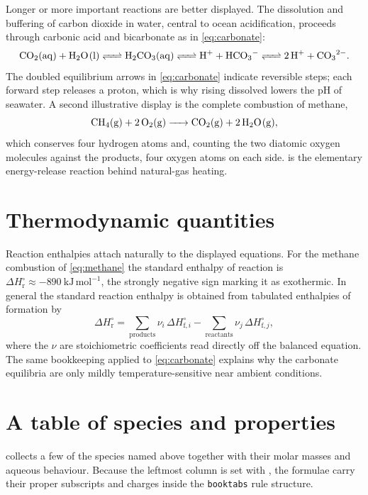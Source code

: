 \documentclass[11pt]{article}
\begin{document}
Longer or more important reactions are better displayed. The dissolution and
buffering of carbon dioxide in water, central to ocean acidification, proceeds
through carbonic acid and bicarbonate as in \cref{eq:carbonate}:
%
\begin{equation}
  \ce{CO2(aq) + H2O(l) <=> H2CO3(aq) <=> H+ + HCO3^- <=> 2 H+ + CO3^2-}.
  \label{eq:carbonate}
\end{equation}
%
The doubled equilibrium arrows in \cref{eq:carbonate} indicate reversible steps;
each forward step releases a proton, which is why rising dissolved 
lowers the $\mathrm{pH}$ of seawater. A second illustrative display is the
complete combustion of methane,
%
\begin{equation}
  \ce{CH4(g) + 2 O2(g) -> CO2(g) + 2 H2O(g)},
  \label{eq:methane}
\end{equation}
%
which conserves four hydrogen atoms and, counting the two diatomic oxygen
molecules against the products, four oxygen atoms on each side. 
is the elementary energy-release reaction behind natural-gas heating.

\section{Thermodynamic quantities}

Reaction enthalpies attach naturally to the displayed equations. For the methane
combustion of \cref{eq:methane} the standard enthalpy of reaction is
$\Delta H^\circ_{\mathrm{r}} \approx -890~\mathrm{kJ\,mol^{-1}}$, the strongly
negative sign marking it as exothermic. In general the standard reaction enthalpy
is obtained from tabulated enthalpies of formation by
\[
  \Delta H^\circ_{\mathrm{r}}
  = \sum_{\text{products}} \nu_i\, \Delta H^\circ_{\mathrm{f},i}
  - \sum_{\text{reactants}} \nu_j\, \Delta H^\circ_{\mathrm{f},j},
\]
where the $\nu$ are stoichiometric coefficients read directly off the balanced
equation. The same bookkeeping applied to \cref{eq:carbonate} explains why the
carbonate equilibria are only mildly temperature-sensitive near ambient
conditions.

\section{A table of species and properties}

 collects a few of the species named above together with their
molar masses and aqueous behaviour. Because the leftmost column is set with
\ce{}, the formulae carry their proper subscripts and charges inside the
\texttt{booktabs} rule structure.
\end{document}
